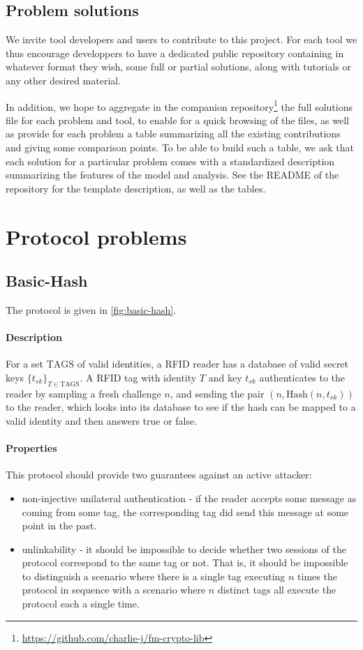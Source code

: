 \documentclass{article}
\newcommand{\sfsk}{\mathit{sk}}
\newcommand{\kwf}[1]{\mathrm{#1}}
\newcommand{\hash}{\kwf{Hash}}
\newcommand{\tagset}{\kwf{TAGS}}
\begin{document}
\subsection{Problem solutions}

We invite tool developers and users to contribute to this project. For each tool we thus encourage developpers to have a dedicated public repository containing in whatever format they wish, some full or partial solutions, along with tutorials or any other desired material.


In addition, we hope to aggregate in the companion repository\footnote{\url{https://github.com/charlie-j/fm-crypto-lib}} the full solutions file for each problem and tool, to enable for a quick browsing of the files, as well as provide for each problem a table summarizing all the existing contributions and giving some comparison points. To be able to build such a table, we ask that each solution for a particular problem comes with a standardized description summarizing the features of the model and analysis. See the README of the repository for the template description, as well as the tables.

\section{Protocol problems}


\subsection{Basic-Hash}\label{prob:basic-hash}

The protocol is given in \cref{fig:basic-hash}. 

\paragraph{Description} For a set $\tagset$ of valid identities, a RFID reader has a database of valid secret keys $\{t_\sfsk\}_{T \in \tagset}$. A RFID tag with identity $T$ and key $t_\sfsk$ authenticates to the reader by sampling a fresh challenge $n$, and sending the pair $(n,\hash(n,t_\sfsk))$ to the reader, which looks into its database to see if the hash can be mapped to a valid identity and then answers true or false.


\paragraph{Properties} This protocol should provide two guarantees against an active attacker:
\begin{itemize}
\item non-injective unilateral authentication - if the reader accepts some message as coming from some tag, the corresponding tag did send this message at some point in the past.
\item unlinkability - it should be impossible to decide whether two sessions of the protocol correspond to the same tag or not. That is, it should be impossible to distinguish a scenario where there is a single tag executing $n$ times the protocol in sequence with a scenario where $n$ distinct tags all execute the protocol each a single time. 
\end{itemize}
\end{document}
